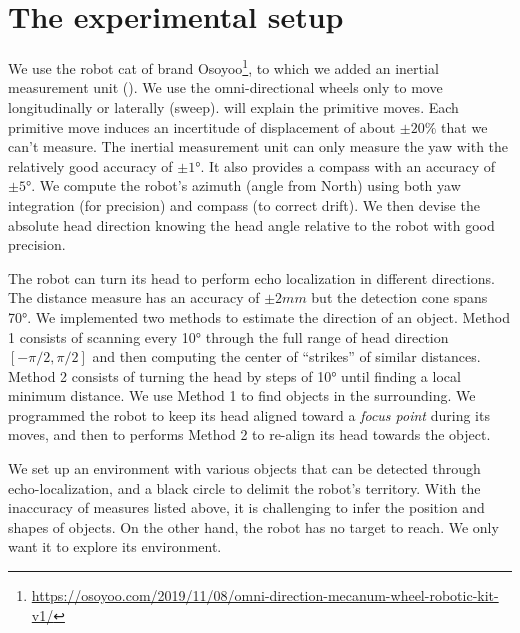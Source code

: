 \documentclass[pmlr]{jmlr}%
\begin{document}
\section{The experimental setup}
\label{sec:experiment}

We use the robot cat of brand Osoyoo\footnote{\url{https://osoyoo.com/2019/11/08/omni-direction-mecanum-wheel-robotic-kit-v1/}}, to which we added an inertial measurement unit (). 
We use the omni-directional wheels only to move longitudinally or laterally (sweep). 
 will explain the primitive moves. 
Each primitive move induces an incertitude of displacement of about $\pm20\%$ that we can't measure. 
The inertial measurement unit can only measure the yaw with the relatively good accuracy of $\pm1$°.
It also provides a compass with an accuracy of $\pm5$°. 
We compute the robot's azimuth (angle from North) using both yaw integration (for precision) and compass (to correct drift).
We then devise the absolute head direction knowing the head angle relative to the robot with good precision.

The robot can turn its head to perform echo localization in different directions. 
The distance measure has an accuracy of $\pm 2mm$ but the detection cone spans 70°.  
We implemented two methods to estimate the direction of an object. 
Method 1 consists of scanning every 10° through the full range of head direction $[-\pi/2, \pi/2]$ and then computing the center of ``strikes'' of similar distances.
Method 2 consists of turning the head by steps of 10° until finding a local minimum distance.
We use Method 1 to find objects in the surrounding. 
We programmed the robot to keep its head aligned toward a \textit{focus point} during its moves,
and then to performs Method 2 to re-align its head towards the object.

We set up an environment with various objects that can be detected through echo-localization, and a black circle to delimit the robot's territory.
With the inaccuracy of measures listed above, it is challenging to infer the position and shapes of objects. 
On the other hand, the robot has no target to reach. 
We only want it to explore its environment. 
\end{document}
